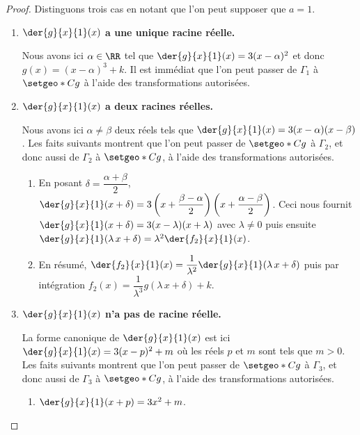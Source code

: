 \begin{proof}
	Distinguons trois cas en notant que l'on peut supposer que $a = 1$.
	
	\begin{enumerate}
		\item \textbf{$\der{g}{x}{1}(x)$ a une unique racine réelle.}

		      \smallskip

		      \noindent
		      Nous avons ici $\alpha \in \RR$ tel que $\der{g}{x}{1}(x) = 3(x - \alpha)^2$ et donc $g(x) = (x - \alpha)^3 + k$.
		      Il est immédiat que l'on peut passer de $\Gamma_1$ à $\setgeo*{C}{g}$ à l'aide des transformations autorisées.


		\medskip
		
		\item \textbf{$\der{g}{x}{1}(x)$ a deux racines réelles.}

		      \smallskip

		      \noindent
		      Nous avons ici $\alpha \neq \beta$ deux réels tels que $\der{g}{x}{1}(x) = 3 (x - \alpha) (x - \beta)$.
		      Les faits suivants montrent que l'on peut passer de $\setgeo*{C}{g}$ à $\Gamma_2$, et donc aussi de $\Gamma_2$ à $\setgeo*{C}{g}$, à l'aide des transformations autorisées.
		      \begin{enumerate}
		      		\item En posant $\delta = \dfrac{\alpha + \beta}{2}$,
						  $\der{g}{x}{1}(x + \delta) = 3 \left( x + \dfrac{\beta - \alpha}{2} \right) \left( x + \dfrac{\alpha - \beta}{2} \right)$.
				          Ceci nous fournit
				          $\der{g}{x}{1}(x + \delta) = 3 ( x - \lambda) (x + \lambda)$
				          avec $\lambda \neq 0$
				          puis ensuite
				          $\der{g}{x}{1}( \lambda \, x + \delta) = \lambda^2 \der{f_2}{x}{1}(x)$.

		      		\item En résumé,
				          $\der{f_2}{x}{1}(x) = \dfrac{1}{\lambda^2} \der{g}{x}{1}(\lambda \, x + \delta)$
				          puis par intégration
				          $f_2(x) = \dfrac{1}{\lambda^3} g(\lambda \, x + \delta) + k$.
		      \end{enumerate}


		
		\medskip
		
		\item \textbf{$\der{g}{x}{1}(x)$ n'a pas de racine réelle.}

		      \smallskip

		      \noindent
		      La forme canonique de $\der{g}{x}{1}(x)$ est ici
		      $\der{g}{x}{1}(x) = 3(x - p)^2 + m$ où les réels $p$ et $m$ sont tels que $m > 0$.
		      Les faits suivants montrent que l'on peut passer de $\setgeo*{C}{g}$ à $\Gamma_3$, et donc aussi de $\Gamma_3$ à $\setgeo*{C}{g}$, à l'aide des transformations autorisées.
		      \begin{enumerate}
		      		\item $\der{g}{x}{1}(x + p) = 3 x^2 + m$.
				          


\end{enumerate}
\end{enumerate}
\end{proof}

